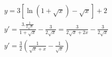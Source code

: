 \begin{ex}
\begin{align}
&y=3[\ln(1+\sqrt{x})-\sqrt{x}]+2\nonumber\\
&y'=\frac{3.\frac{1}{2\sqrt{x}}}{1+\sqrt{x}}-\frac{3}{2\sqrt{x}}=\frac{3}{2\sqrt{x}+2x}-\frac{3}{2\sqrt{x}}\nonumber\\
&y'=\frac{3}{2}\left(\frac{1}{\sqrt{x}+x}-\frac{1}{\sqrt{x}}\right)\nonumber
\end{align}
\end{ex}